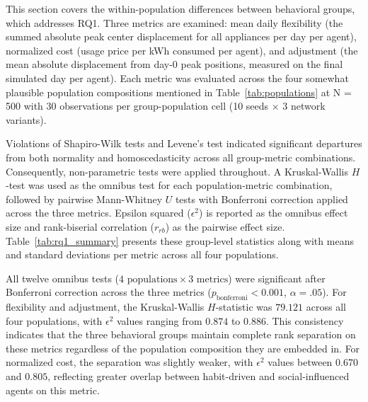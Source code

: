 \documentclass[11pt, a4paper]{article}
\begin{document}
This section covers the within-population differences between behavioral groups, which addresses RQ1. Three metrics are examined: mean daily flexibility (the summed absolute peak center displacement for all appliances per day per agent), normalized cost (usage price per kWh consumed per agent), and adjustment (the mean absolute displacement from day-0 peak positions, measured on the final simulated day per agent). Each metric was evaluated across the four somewhat plausible population compositions mentioned in Table~\ref{tab:populations} at N = 500 with 30 observations per group-population cell (10 seeds × 3 network variants).

Violations of Shapiro-Wilk tests and Levene's test indicated significant departures from both normality and homoscedasticity across all group-metric combinations. Consequently, non-parametric tests were applied throughout. A Kruskal-Wallis $H$-test was used as the omnibus test for each population-metric combination, followed by pairwise Mann-Whitney $U$ tests with Bonferroni correction applied across the three metrics. Epsilon squared ($\epsilon^2$) is reported as the omnibus effect size and rank-biserial correlation ($r_{rb}$) as the pairwise effect size. Table~\ref{tab:rq1_summary} presents these group-level statistics along with means and standard deviations per metric across all four populations. 

All twelve omnibus tests ($4 \text{ populations} \times 3 \text{ metrics}$) were significant after Bonferroni correction across the three metrics ($p_{\text{bonferroni}} < 0.001$, $\alpha = .05$). For flexibility and adjustment, the Kruskal-Wallis $H$-statistic was $79.121$ across all four populations, with $\epsilon^2$ values ranging from $0.874$ to $0.886$. This consistency indicates that the three behavioral groups maintain complete rank separation on these metrics regardless of the population composition they are embedded in. For normalized cost, the separation was slightly weaker, with $\epsilon^2$ values between $0.670$ and $0.805$, reflecting greater overlap between habit-driven and social-influenced agents on this metric.
\end{document}
